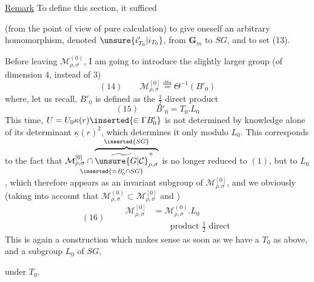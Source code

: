 \uline{Remark}\quad{}
To define this section, it sufficed



(from the point of view of pure calculation) to give oneself an arbitrary homomorphism, denoted
$\unsure{i'_{T_0}|i_{T_0}}$, from $\mathbf G_m$ to $SG$, and to set (13).

Before leaving $\mathcal M_{\rho,\sigma}^{(0)}$, I am going to introduce the
slightly larger group (of dimension 4, instead of 3)
\[
(14)\qquad\mathcal M_{\rho,\sigma}^{[0]}
\overset{\mathrm{dfn}}{=}\Theta^{-1}(B'_0)
\]
where, let us recall, $B'_0$ is defined as the $\frac12$ direct product
\[
(15)\qquad B'_0=T_0.L_0
\]
This time, $U=U_0\kappa(r)\inserted{\in\Gamma B'_0}$ is not determined
by knowledge alone of its determinant
$\underline\kappa(r)^2$, which determines it only modulo $L_0$.
This corresponds to the fact that
$\underset{\inserted{=B'_0\cap SG}}{
\mathcal M_{\rho,\sigma}^{[0]}\cap
\overbrace{\widetilde{\unsure{G|\mathcal C}}_{\rho,\sigma}^{+}}^{\inserted{SG}}}$
is no longer reduced to $(1)$, but to $L_0$, which therefore appears as
an invariant subgroup of $\mathcal M_{\rho,\sigma}^{[0]}$, and we obviously 
(taking into account that $\mathcal M_{\rho,\sigma}^{(0)}\subset\mathcal M_{\rho,\sigma}^{[0]}$ and
) 
\[
(16)\qquad\begin{aligned}
\mathcal M_{\rho,\sigma}^{[0]}&=\mathcal M_{\rho,\sigma}^{(0)}.L_0\\
&\qquad\text{product }\frac12\text{ direct}
\end{aligned}
\]
This is again a construction which makes sense as soon as we have a $T_0$ as above,
 and a subgroup  $L_0$ of $SG$,



 under $T_0$. 

